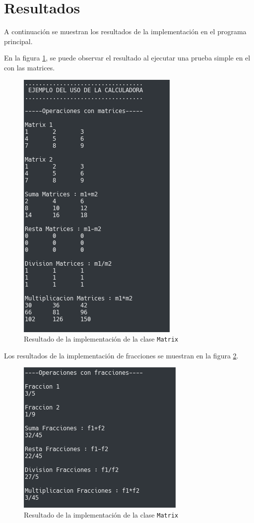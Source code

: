 \section{Resultados}

A continuación se muestran los resultados de la implementación en el programa principal.

En la figura \ref{fig:res1}, se puede observar el resultado al ejecutar una prueba simple en el con las matrices. 

\begin{figure}[H]
\centering
\includegraphics[width=.4\textwidth]{imgs/Labo4/result1}
\caption{Resultado de la implementación de la clase \texttt{Matrix}}
\label{fig:res1}
\end{figure}

Los resultados de la implementación de fracciones se muestran en la figura \ref{fig:res2}.

\begin{figure}[H]
\centering
\includegraphics[width=.4\textwidth]{imgs/Labo4/result2}
\caption{Resultado de la implementación de la clase \texttt{Matrix}}
\label{fig:res2}
\end{figure}

